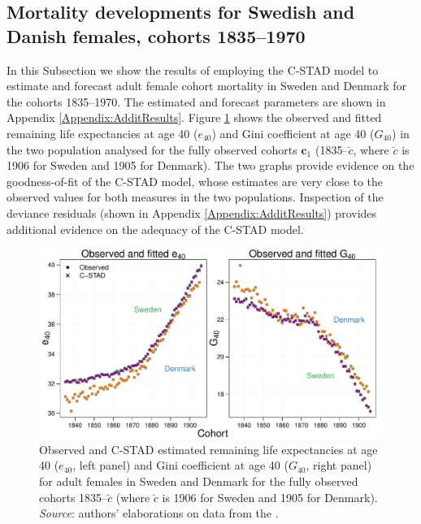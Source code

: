 \documentclass[11pt, a4paper]{article}
\begin{document}
\subsection{Mortality developments for Swedish and Danish females, cohorts 1835--1970}
\label{Subsec:ForecastC-STAD}
In this Subsection we show the results of employing the C-STAD model to estimate and forecast adult female cohort mortality in Sweden and Denmark for the cohorts 1835--1970. The estimated and forecast parameters are shown in Appendix \ref{Appendix:AdditResults}. Figure \ref{Fig:CSTADfitE40G40} shows the observed and fitted remaining life expectancies at age 40 ($e_{40}$) and Gini coefficient at age 40 ($G_{40}$) in the two population analysed for the fully observed cohorts $\bm{c}_1$ (1835--$\breve{c}$, where $\breve{c}$ is 1906 for Sweden and 1905 for Denmark). The two graphs provide evidence on the goodness-of-fit of the C-STAD model, whose estimates are very close to the observed values for both measures in the two populations. Inspection of the deviance residuals (shown in Appendix \ref{Appendix:AdditResults}) provides additional evidence on the adequacy of the C-STAD model. \par

\begin{figure}[t]
	\begin{center}
		\includegraphics[scale=0.57]{./Figures/F5.pdf} 
		\caption{Observed and C-STAD estimated remaining life expectancies at age 40 ($e_{40}$, left panel) and Gini coefficient at age 40 ($G_{40}$, right panel) for adult females in Sweden and Denmark for the fully observed cohorts 1835--$\breve{c}$ (where $\breve{c}$ is 1906 for Sweden and 1905 for Denmark).\\ \small \textit{Source}: authors' elaborations on data from the \cite{HMD}.\label{Fig:CSTADfitE40G40}}    
	\end{center}
\end{figure}
\end{document}
